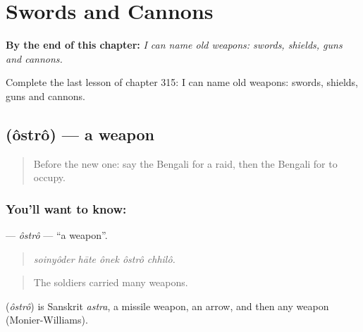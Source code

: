 
\chapter{Swords and Cannons}
\label{ch:bn-swords-and-cannons}

\begin{chapteropening}
\textbf{By the end of this chapter:} \emph{I can name old weapons: swords, shields, guns and cannons.}

Complete the last lesson of chapter 315: I can name old weapons: swords, shields, guns and cannons.
\end{chapteropening}

\section[\texorpdfstring{\bn{অস্ত্র} (ôstrô)}{অস্ত্র (ôstrô)}]{ (ôstrô) — a weapon}

\label{lesson:BN-C315-ostro}



\begin{quote}
Before the new one: say the Bengali for a raid, then the Bengali for to occupy.
\end{quote}

\subsection*{You'll want to know: }
\textbf{} — \emph{ôstrô} — \textquotedblleft{}a weapon\textquotedblright{}.

\begin{quote}
    
\end{quote}

\begin{quote}
\emph{soinyôder hāte ônek ôstrô chhilô.}
\end{quote}

\begin{quote}
The soldiers carried many weapons.
\end{quote}

\begin{cousinweb}
\textbf{} (\emph{ôstrô}) is Sanskrit \emph{astra}, a missile weapon, an arrow, and then any weapon (Monier-Williams).
\end{cousinweb}

